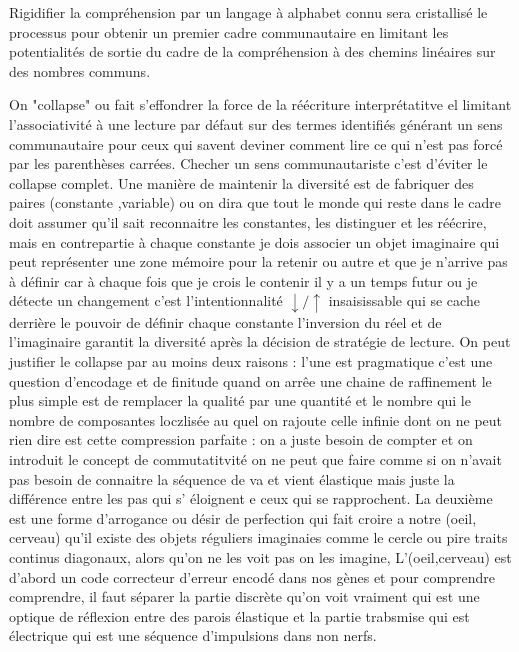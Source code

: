 \documentclass{article}
\begin{document}
 Rigidifier la compréhension par un langage à alphabet connu sera cristallisé le processus pour obtenir un premier cadre communautaire en limitant les potentialités de sortie du cadre de la compréhension  à des chemins linéaires sur des nombres communs.
 
  On "collapse" ou fait s'effondrer la force de la réécriture interprétatitve el limitant l'associativité à une lecture par défaut sur des termes identifiés 
  générant un sens communautaire pour ceux qui savent deviner comment lire ce qui n'est pas forcé par les parenthèses carrées.
  Checher un sens communautariste c'est  
d'éviter   le collapse complet.  
Une  manière de maintenir la diversité  est de fabriquer des paires (constante ,variable) ou on dira que tout le monde qui reste dans le cadre doit assumer qu'il  sait reconnaitre les constantes, les distinguer et les réécrire, mais  en contrepartie à chaque constante je dois associer un objet imaginaire qui peut représenter une zone mémoire pour la retenir ou autre et que je n'arrive pas à définir car à chaque fois que je crois le contenir il y a un temps futur ou je détecte un changement c'est l'intentionnalité $\downarrow/\uparrow$ insaisissable qui se cache derrière le pouvoir de définir chaque constante l'inversion du réel et de l'imaginaire garantit la diversité après la décision de stratégie de lecture. 
On peut justifier le collapse par au moins deux raisons : l'une est pragmatique c'est une question d'encodage et de finitude quand on arrêe une chaine de raffinement le plus simple est de remplacer la qualité par une quantité et le nombre qui le nombre de composantes loczlisée au quel on rajoute  celle infinie dont on ne peut rien dire est cette compression parfaite : on a juste besoin de compter et on introduit le concept de commutatitvité on ne peut que faire comme si on n'avait pas besoin de connaitre la séquence de va et vient élastique mais juste la différence entre les pas qui s' éloignent e ceux qui se rapprochent. 
La deuxième  est une forme d'arrogance ou  désir de perfection qui fait croire a notre (oeil, cerveau) qu'il existe des objets réguliers imaginaies comme le cercle ou pire traits continus diagonaux, alors qu'on ne les voit pas on les imagine, L'(oeil,cerveau) est d'abord un code correcteur d'erreur encodé dans nos gènes et pour comprendre comprendre, il faut séparer la partie discrète qu'on voit vraiment qui est une optique de réflexion entre des parois élastique et la partie trabsmise qui est électrique qui est une séquence d'impulsions dans non nerfs.
  
\end{document}

